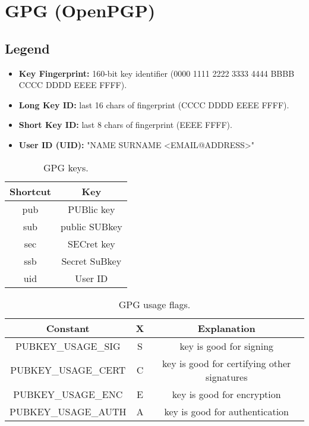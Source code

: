 \documentclass[10pt, a4paper, onecolumn, oneside, titlepage, openany]{book}
\begin{document}
\chapter{GPG (OpenPGP)}
\section{Legend}
\begin{itemize}
    \item \textbf{Key Fingerprint:} 160-bit key identifier (0000 1111 2222 3333 4444 BBBB CCCC DDDD EEEE FFFF).
    \item \textbf{Long Key ID:} last 16 chars of fingerprint (CCCC DDDD EEEE FFFF).
    \item \textbf{Short Key ID:} last 8 chars of fingerprint (EEEE FFFF).
    \item \textbf{User ID (UID):} "NAME SURNAME <EMAIL@ADDRESS>"
\end{itemize}

\begin{table}[!ht]
\centering
\begin{tabular}{|c|c|}
    \hline
    \textbf{Shortcut} & \textbf{Key} \\
    \hline
    pub & PUBlic key\\
    sub & public SUBkey\\
    sec & SECret key\\
    ssb & Secret SuBkey\\
    uid & User ID\\
    \hline
\end{tabular}
\caption{GPG keys.}
\label{table:gpg_keys}
\end{table}

\begin{table}[!ht]
\centering
\begin{tabular}{|c|c|c|}
    \hline
    \textbf{Constant} & \textbf{X} & \textbf{Explanation} \\
    \hline
    PUBKEY\_USAGE\_SIG & S & key is good for signing \\
    PUBKEY\_USAGE\_CERT & C & key is good for certifying other signatures\\
    PUBKEY\_USAGE\_ENC & E & key is good for encryption\\
    PUBKEY\_USAGE\_AUTH & A & key is good for authentication\\
    \hline
\end{tabular}
\caption{GPG usage flags.}
\label{table:gpg_usage_flags}
\end{table}
\end{document}
